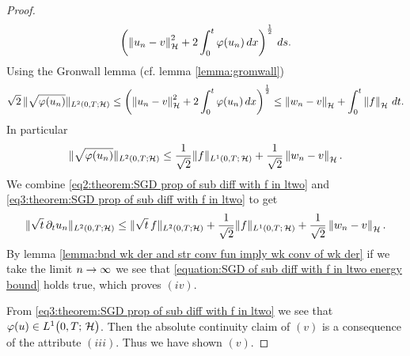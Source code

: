 \begin{proof}
\begin{align*}
		\left(\left\Vert u_n-v\right\Vert_{\mathcal{H}}^2+2\int_0^t \varphi(u_n)\, dx\right)^{\frac{1}{2}}\,ds.
	\end{align*}
	Using the Gronwall lemma (cf. lemma \ref{lemma:gromwall})
	\begin{align*}
		\sqrt{2}\,\Vert \sqrt{\varphi(u_n)}\Vert_{L^2(0,T;\mathcal{H})}
		\leq \left(\left\Vert u_n-v\right\Vert_{\mathcal{H}}^2+2\int_0^t \varphi(u_n)\, dx\right)^{\frac{1}{2}}
		\leq \left\Vert w_n-v\right\Vert_{\mathcal{H}}+\int_0^t\left\Vert f\right\Vert_{\mathcal{H}}\,dt.
	\end{align*}
	In particular
	\begin{align}\label{eq3:theorem:SGD prop of sub diff with f in ltwo}
		\Vert \sqrt{\varphi(u_n)}\Vert_{L^2(0,T;\mathcal{H})}
		\leq
		\frac{1}{\sqrt{2}}\Vert f\Vert_{L^1(0,T;\,\mathcal{H})}
		+\frac{1}{\sqrt{2}}\left\Vert w_n-v\right\Vert_{\mathcal{H}}.
	\end{align}
	We combine \eqref{eq2:theorem:SGD prop of sub diff with f in ltwo}
	and \eqref{eq3:theorem:SGD prop of sub diff with f in ltwo}
	to get
	\begin{align*}
		\Vert \sqrt{t}\,\partial_t u_n\Vert_{L^2(0,T;\mathcal{H})}
		\leq \Vert \sqrt{t}\,f\Vert_{L^2(0,T;\mathcal{H})}
		+\frac{1}{\sqrt{2}}\Vert f\Vert_{L^1(0,T;\,\mathcal{H})}
		+\frac{1}{\sqrt{2}}\left\Vert w_n-v\right\Vert_{\mathcal{H}}.
	\end{align*}
	By lemma \ref{lemma:bnd wk der and str conv fun imply wk conv of wk der}
	if we take the limit $ n\rightarrow \infty $ we see that 
	\eqref{equation:SGD of sub diff with f in ltwo energy bound}
	holds true, which proves $ (iv) $.\smallskip
	
	From \eqref{eq3:theorem:SGD prop of sub diff with f in ltwo}
	we see that $ \varphi(u)\in L^{1}\big(0,T;\,\mathcal{H}\big) $. Then the absolute
	continuity claim of $ (v) $ is a consequence
	of the attribute $ (iii) $. Thus
	we have shown $ (v) $.\smallskip
	

\end{proof}
